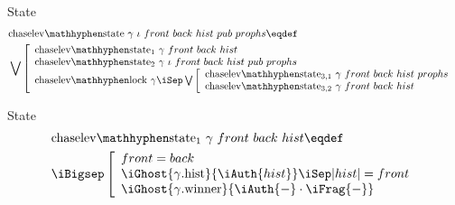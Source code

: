 \begin{frame}{State}
\small
\begin{align*}
		&\mathrm{chaselev \mathhyphen state}\ \gamma\ \iota\ front\ back\ hist\ pub\ prophs
		\eqdef
	\\
		&\bigvee\left[\begin{array}{l}
				\mathrm{chaselev \mathhyphen state_1}\ \gamma\ front\ back\ hist
			\\
				\mathrm{chaselev \mathhyphen state_2}\ \gamma\ \iota\ front\ back\ hist\ pub\ prophs
			\\
				\mathrm{chaselev \mathhyphen lock}\ \gamma \iSep
				\bigvee\left[\begin{array}{l}
						\mathrm{chaselev \mathhyphen state_{3,1}}\ \gamma\ front\ back\ hist\ prophs
					\\
						\mathrm{chaselev \mathhyphen state_{3,2}}\ \gamma\ front\ back\ hist
				\end{array}\right.
		\end{array}\right.
\end{align*}
\end{frame}


\begin{frame}{State}
\begin{align*}
		&\mathrm{chaselev \mathhyphen state_1}\ \gamma\ front\ back\ hist
		\eqdef
	\\
		&\iBigsep\left[\begin{array}{l}
				front = back
			\\
				\iGhost{\gamma\mathrm{.hist}}{\iAuth{hist}} \iSep
				| hist | = front
			\\
				\iGhost{\gamma\mathrm{.winner}}{\iAuth{-} \cdot \iFrag{-}}
		\end{array}\right.
\end{align*}
\end{frame}


